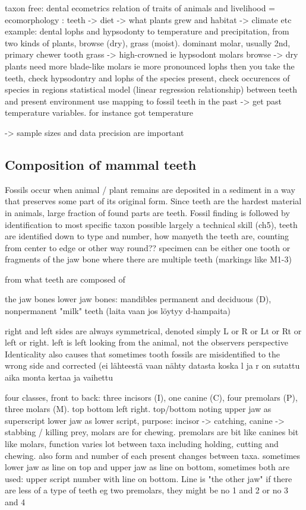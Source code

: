 \documentclass{article}
\begin{document}
taxon free: dental ecometrics
relation of traits of animals and livelihood = ecomorphology \cite{oksanenHumboldtianApproachLife2019}:
    teeth -> diet -> what plants grew and habitat -> climate etc
example: dental lophs and hypsodonty to temperature and precipitation, from \cite{oksanenHumboldtianApproachLife2019}
    two kinds of plants, browse (dry), grass (moist).
    dominant molar, usually 2nd, primary chewer tooth
    grass -> high-crowned ie hypsodont molars
    browse -> dry plants need more blade-like molars ie more pronounced lophs
    then you take the teeth, check hypsodontry and lophs of the species present, check occurences of species in regions 
        statistical model (linear regression relationship) between teeth and present environment
        use mapping to fossil teeth in the past -> get past temperature variables. \cite{oksanenHumboldtianApproachLife2019} for instance got temperature


-> sample sizes and data precision are important

\subsection{Composition of mammal teeth}

Fossils occur when animal / plant remains are deposited in a sediment in a way that preserves 
some part of its original form. Since teeth are the hardest material in animals, large fraction
of found parts are teeth. Fossil finding is followed by identification to most specific taxon possible
largely a technical skill (ch5), teeth are identified down to type and number, how manyeth the teeth are,
counting from center to edge or other way round??
specimen can be either one tooth or fragments of the jaw bone where there are multiple teeth (markings like M1-3)

from \cite{Hillson_2005} what teeth are composed of

 the jaw bones
lower jaw bones: mandibles
 permanent and deciduous (D), nonpermanent "milk" teeth (laita vaan jos löytyy d-hampaita)

right and left sides are always symmetrical, denoted simply L or R or Lt or Rt or left or right. left is left looking from the animal, not the observers perspective
Identicality also causes that sometimes tooth fossils are misidentified to the wrong side and corrected (ei lähteestä vaan nähty datasta koska l ja r on sutattu aika monta kertaa ja vaihettu

four classes, front to back: three incisors (I), one canine (C), four premolars (P), three molars (M). top bottom left right. top/bottom noting upper jaw as superscript lower jaw as lower script, 
 purpose: incisor -> catching, canine -> stabbing / killing prey, molars are for chewing. premolars are bit like canines bit like molars, function varies lot
 between taxa including holding, cutting and chewing. also form and number of each present changes between taxa.
sometimes lower jaw as line on top and upper jaw as line on bottom, sometimes both are used: upper script number with line on bottom. Line is "the other jaw"
if there are less of a type of teeth eg two premolars, they might be no 1 and 2 or no 3 and 4
\end{document}
